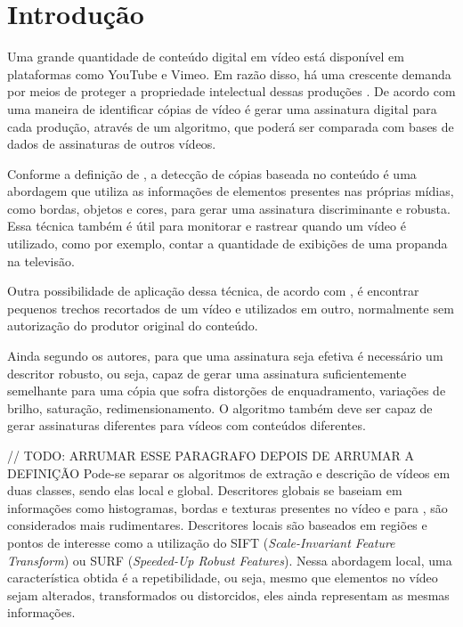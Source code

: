 
\chapter{Introdução}
\label{chap:introducao}


Uma grande quantidade de conteúdo digital em vídeo está disponível em plataformas como YouTube e Vimeo. Em razão disso, há uma crescente demanda por meios de proteger a propriedade intelectual dessas produções \citeauthor{hua2004robust}. De acordo com \citeauthor{kim2005spatiotemporal} uma maneira de identificar cópias de vídeo é gerar uma assinatura digital para cada produção, através de um algoritmo, que poderá ser comparada com bases de dados de assinaturas de outros vídeos.

Conforme a definição de \citeauthor{kim2005spatiotemporal}, a detecção de cópias baseada no conteúdo é uma abordagem que utiliza as informações de elementos presentes nas próprias mídias, como bordas, objetos e cores, para gerar uma assinatura discriminante e robusta. Essa técnica também é útil para monitorar e rastrear quando um vídeo é utilizado, como por exemplo, contar a quantidade de exibições de uma propanda na televisão. 
    
Outra possibilidade de aplicação dessa técnica, de acordo com \citeauthor{chen2008video}, é encontrar pequenos trechos recortados de um vídeo e utilizados em outro, normalmente sem autorização do produtor original do conteúdo.

Ainda segundo os autores, para que uma assinatura seja efetiva é necessário um descritor robusto, ou seja, capaz de gerar uma assinatura suficientemente semelhante para uma cópia que sofra distorções de enquadramento, variações de brilho, saturação, redimensionamento. O algoritmo também deve ser capaz de gerar assinaturas diferentes para vídeos com conteúdos diferentes. 
    

// TODO: ARRUMAR ESSE PARAGRAFO DEPOIS DE ARRUMAR A DEFINIÇÃO Pode-se separar os algoritmos de extração e descrição de vídeos em duas classes, sendo elas local e global. Descritores globais se baseiam em informações como histogramas, bordas e texturas presentes no vídeo e para \citeauthor{santos2004segmentaccao}, são considerados mais rudimentares.  Descritores locais são baseados em regiões e pontos de interesse como a utilização do SIFT (\textit{Scale-Invariant Feature Transform}) ou SURF (\textit{Speeded-Up Robust Features}). Nessa abordagem local, uma característica obtida é a repetibilidade, ou seja, mesmo que elementos no vídeo sejam alterados, transformados ou distorcidos, eles ainda representam as mesmas informações.
    
